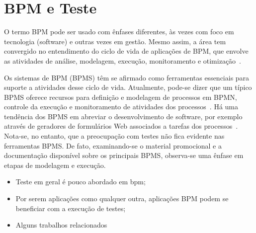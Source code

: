 \documentclass[12pt]{article}
\begin{document}
	
\section{BPM e Teste}

O termo BPM pode ser usado com ênfases diferentes, às vezes com foco em tecnologia (software) e outras vezes em gestão. Mesmo assim, a área tem convergido no entendimento do ciclo de vida de aplicações de BPM, que envolve as atividades de análise, modelagem, execução, monitoramento e otimização~\cite{ABPMP}. 

Os sistemas de BPM (BPMS) têm se afirmado como ferramentas essenciais para suporte a atividades desse ciclo de vida. Atualmente, pode-se dizer que um típico BPMS oferece recursos para definição e modelagem de processos em BPMN, controle da execução e monitoramento de atividades dos processos~\cite{forrester}. Há uma tendência dos BPMS em abreviar o desenvolvimento de software, por exemplo através de geradores de formulários Web associados a tarefas dos processos~\cite{greenresearch}. Nota-se, no entanto, que a preocupação com testes não fica evidente nas ferramentas BPMS. De fato, examinando-se o material promocional e a documentação disponível sobre os principais BPMS, observa-se uma ênfase em etapas de modelagem e execução.

\begin{itemize}
\item Teste em geral é pouco abordado em bpm;
\item Por serem aplicações como qualquer outra, aplicações BPM podem se beneficiar com a execução de testes;
\item Alguns trabalhos relacionados
\end{itemize}


\end{document}
